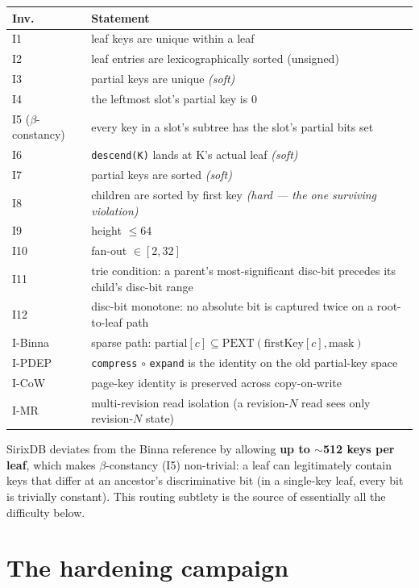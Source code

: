 \documentclass[11pt,a4paper,oneside]{report}
\theoremstyle{sirixthm}
\newcommand{\code}[1]{\texttt{#1}}
\begin{document}
\begin{table}[h]
\footnotesize\setlength{\tabcolsep}{6pt}
\renewcommand{\arraystretch}{1.15}
\begin{tabularx}{\linewidth}{@{}l X@{}}
\toprule
\textbf{Inv.} & \textbf{Statement}\\
\midrule
I1 & leaf keys are unique within a leaf\\
I2 & leaf entries are lexicographically sorted (unsigned)\\
I3 & partial keys are unique \emph{(soft)}\\
I4 & the leftmost slot's partial key is 0\\
I5 ($\beta$-constancy) & every key in a slot's subtree has the slot's partial bits set\\
I6 & \code{descend(K)} lands at K's actual leaf \emph{(soft)}\\
I7 & partial keys are sorted \emph{(soft)}\\
I8 & children are sorted by first key \emph{(hard --- the one surviving violation)}\\
I9 & height $\leq 64$\\
I10 & fan-out $\in [2,32]$\\
I11 & trie condition: a parent's most-significant disc-bit precedes its child's disc-bit range\\
I12 & disc-bit monotone: no absolute bit is captured twice on a root-to-leaf path\\
I-Binna & sparse path: $\text{partial}[c] \subseteq \text{PEXT}(\text{firstKey}[c],\text{mask})$\\
I-PDEP & \code{compress}$\,\circ\,$\code{expand} is the identity on the old partial-key space\\
I-CoW & page-key identity is preserved across copy-on-write\\
I-MR & multi-revision read isolation (a revision-$N$ read sees only revision-$N$ state)\\
\bottomrule
\end{tabularx}
\end{table}

SirixDB deviates from the Binna reference by allowing \textbf{up to $\sim$512 keys per leaf},
which makes $\beta$-constancy (I5) non-trivial: a leaf can legitimately contain keys that
differ at an ancestor's discriminative bit (in a single-key leaf, every bit is trivially
constant). This routing subtlety is the source of essentially all the difficulty below.

\section{The hardening campaign}
\label{sec:hotcampaign}
\end{document}
